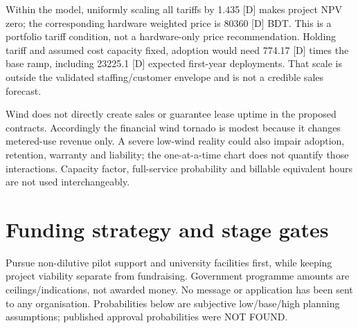 \documentclass[11pt,a4paper]{article}
\begin{document}
Within the model, uniformly scaling all tariffs by \num{1.435} [D] makes project NPV zero; the corresponding hardware weighted price is \num{80360} [D] BDT. This is a portfolio tariff condition, not a hardware-only price recommendation. Holding tariff and assumed cost capacity fixed, adoption would need \num{774.17} [D] times the base ramp, including \num{23225.1} [D] expected first-year deployments. That scale is outside the validated staffing/customer envelope and is not a credible sales forecast.

Wind does not directly create sales or guarantee lease uptime in the proposed contracts. Accordingly the financial wind tornado is modest because it changes metered-use revenue only. A severe low-wind reality could also impair adoption, retention, warranty and liability; the one-at-a-time chart does not quantify those interactions. Capacity factor, full-service probability and billable equivalent hours are not used interchangeably.

\clearpage\section{Funding strategy and stage gates}
Pursue non-dilutive pilot support and university facilities first, while keeping project viability separate from fundraising. Government programme amounts are ceilings/indications, not awarded money. No message or application has been sent to any organisation. Probabilities below are subjective low/base/high planning assumptions; published approval probabilities were NOT FOUND.
\end{document}
